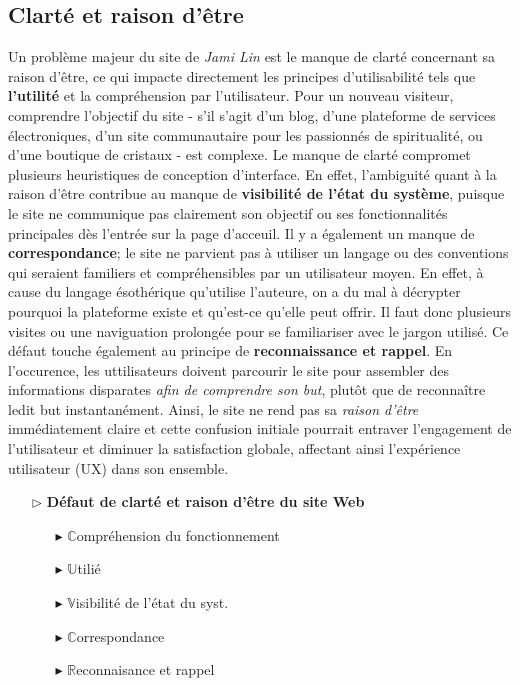 \documentclass[9pt]{report}
\begin{document}
\begin{multicols*}{2}
  \subsection{Clarté et raison d'être} 
  Un problème majeur du site de \textit{\textit{Jami Lin}} est le manque de clarté concernant sa 
  raison d'être, ce qui impacte directement les principes d'utilisabilité tels que 
  \textbf{l'utilité} et la compréhension par l'utilisateur. Pour un nouveau visiteur, 
  comprendre l'objectif du site - s'il s'agit d'un blog, d'une plateforme de 
  services électroniques, d'un site communautaire pour les passionnés de spiritualité,
  ou d'une boutique de cristaux - est complexe. Le manque de clarté 
  compromet plusieurs heuristiques 
  de conception d'interface. En effet, l'ambiguité quant à la raison d'être 
  contribue au manque de 
  \textbf{visibilité de l'état du système}, puisque le site ne communique pas 
  clairement son objectif ou ses fonctionnalités principales dès l'entrée sur 
  la page d'acceuil. 
  Il y a également un manque de \textbf{correspondance}; le site ne parvient pas 
  à utiliser un langage ou des conventions qui seraient familiers et compréhensibles 
  par un utilisateur moyen. En effet, à cause du langage ésothérique 
  qu'utilise l'auteure, on a du mal à décrypter pourquoi la plateforme existe 
  et qu'est-ce qu'elle peut offrir. Il faut donc plusieurs visites 
  ou une naviguation prolongée pour se familiariser avec le jargon utilisé. Ce défaut 
  touche également au principe de \textbf{reconnaissance et rappel}. En l'occurence, 
  les uttilisateurs doivent parcourir le site pour assembler des informations 
  disparates \textit{afin de comprendre son but}, plutôt que de reconnaître
  ledit but instantanément. Ainsi, le  site ne rend pas sa \textit{raison d'être} immédiatement 
  claire et cette confusion initiale pourrait entraver l'engagement de 
  l'utilisateur et diminuer la satisfaction globale, affectant ainsi l'expérience 
  utilisateur (UX) dans son ensemble.
  
  \begin{itemize}
    \item [$\rhd$ ] \textbf{Défaut de clarté et raison d'être du site Web}  
      \begin{itemize}
        \item [$\blacktriangleright$ ] $\mathbb{C}$ompréhension du fonctionnement  
        \item [$\blacktriangleright$ ] $\mathbb{U}$tilié 
        \item [$\blacktriangleright$ ] $\mathbb{V}$isibilité de l'état du syst.
        \item [$\blacktriangleright$ ] $\mathbb{C}$orrespondance
        \item [$\blacktriangleright$ ] $\mathbb{R}$econnaisance et rappel
      \end{itemize}
  \end{itemize}


\end{multicols*}
\end{document}
